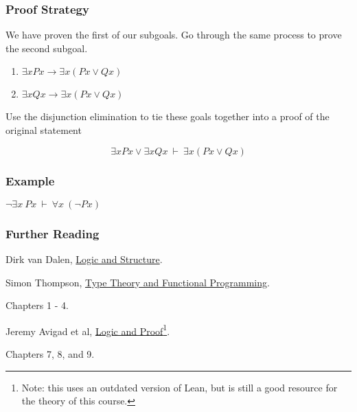 \documentclass{beamer}
\theoremstyle{indentDefn} \newtheorem{defn}[]{Definition}
\begin{document}
\begin{frame}
	\frametitle{Proof Strategy}
	
	We have proven the first of our subgoals. Go through the same process to prove the second subgoal. 
	
	\begin{center}
		\begin{enumerate}
			\item $\exists x Px \rightarrow \exists x (Px \lor Qx)$
			\item $\exists x Qx \rightarrow \exists x (Px \lor Qx)$		
		\end{enumerate}
	\end{center}	
	
	Use the disjunction elimination to tie these goals together into a proof of the original statement
	
	$$\exists x Px \lor \exists x Qx \ \vdash \ \exists x (Px \lor Qx)$$
	
	\vspace{2cm}
	
	
\end{frame}

\begin{frame}
	\frametitle{Example}

	$\lnot \exists x \ Px \ \vdash \ \forall x \ (\lnot Px)$

	\vspace{6cm}

\end{frame}

\begin{frame}
	\frametitle{Further Reading}

	Dirk van Dalen, \href{https://libcat.canterbury.ac.nz/Record/112862}{Logic and Structure}. 

	\vspace{10mm}

	Simon Thompson, \href{https://www.cs.cornell.edu/courses/cs6110/2015sp/textbook/Simon\%20Thompson\%20textbook.pdf}{Type Theory and Functional Programming}. 
	
	Chapters 1 - 4. 

	\vspace{10mm}

	Jeremy Avigad et al, \href{https://leanprover.github.io/logic_and_proof_lean3/index.html}{Logic and Proof}\footnote{Note: this uses an outdated version of Lean, but is still a good resource for the theory of this course.}. 
	
	Chapters 7, 8, and 9.
\end{frame}
\end{document}
